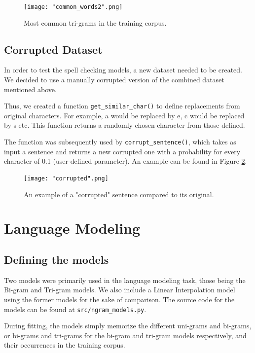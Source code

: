 \documentclass[11pt, a4paper]{article}
\begin{document}
	 \begin{figure}
	    \centering
	    \texttt{[image: "common\_words2".png]}
		\caption{Most common tri-grams in the training corpus.}
	    \label{fig::common_words_2}
	\end{figure}
	
	
	\subsection{Corrupted Dataset}
	
	In order to test the spell checking models, a new dataset needed to be created. We decided to use a manually corrupted version of the combined dataset mentioned above.
	
	Thus, we created a function \texttt{get\_similar\_char()} to define replacements from original characters. For example, a would be replaced by e, c would be replaced by s etc. This function returns a randomly chosen character from those defined.
	
	The function was subsequently used by \texttt{corrupt\_sentence()}, which takes as input a sentence and returns a new corrupted one with a probability for every character of 0.1 (user-defined parameter). An example can be found in Figure \ref{fig::corruption}.
 
	\begin{figure}
	    \centering
	    \texttt{[image: "corrupted".png]}
	    \caption{An example of a "corrupted" sentence compared to its original.}
    \label{fig::corruption}
	\end{figure}
		
	
	\section{Language Modeling}
	
	\subsection{Defining the models}
	
	Two models were primarily used in the language modeling task, those being the Bi-gram and Tri-gram models. We also include a Linear Interpolation model using the former models for the sake of comparison. The source code for the models can be found at \texttt{src/ngram\_models.py}.
	
	During fitting, the models simply memorize the different uni-grams and bi-grams, or bi-grams and tri-grams for the bi-gram and tri-gram models respectively, and their occurrences in the training corpus. 
	
\end{document}

